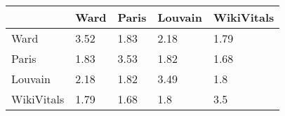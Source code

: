 \begin{tabular}{lllll}
\toprule
{} &  Ward & Paris & Louvain & WikiVitals \\
\midrule
Ward       &  3.52 &  1.83 &    2.18 &       1.79 \\
Paris      &  1.83 &  3.53 &    1.82 &       1.68 \\
Louvain    &  2.18 &  1.82 &    3.49 &       1.8 \\
WikiVitals &  1.79 &  1.68 &    1.8 &        3.5 \\
\bottomrule
\end{tabular}
